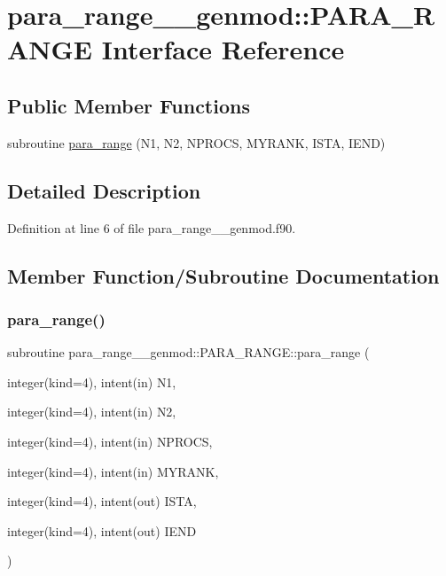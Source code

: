 \hypertarget{interfacepara__range____genmod_1_1_p_a_r_a___r_a_n_g_e}{}\section{para\+\_\+range\+\_\+\+\_\+genmod\+::P\+A\+R\+A\+\_\+\+R\+A\+N\+GE Interface Reference}
\label{interfacepara__range____genmod_1_1_p_a_r_a___r_a_n_g_e}
\subsection*{Public Member Functions}
\begin{DoxyCompactItemize}
\item 
subroutine \mbox{\hyperlink{interfacepara__range____genmod_1_1_p_a_r_a___r_a_n_g_e_af6bdef2d5f139349648221c9cd0d32d6}{para\+\_\+range}} (N1, N2, N\+P\+R\+O\+CS, M\+Y\+R\+A\+NK, I\+S\+TA, I\+E\+ND)
\end{DoxyCompactItemize}


\subsection{Detailed Description}


Definition at line 6 of file para\+\_\+range\+\_\+\+\_\+genmod.\+f90.



\subsection{Member Function/\+Subroutine Documentation}
\mbox{\label{interfacepara__range____genmod_1_1_p_a_r_a___r_a_n_g_e_af6bdef2d5f139349648221c9cd0d32d6}} 
\subsubsection{\texorpdfstring{para\_range()}{para\_range()}}
{\footnotesize\ttfamily subroutine para\+\_\+range\+\_\+\+\_\+genmod\+::\+P\+A\+R\+A\+\_\+\+R\+A\+N\+G\+E\+::para\+\_\+range (\begin{DoxyParamCaption}\item[{integer(kind=4), intent(in)}]{N1,  }\item[{integer(kind=4), intent(in)}]{N2,  }\item[{integer(kind=4), intent(in)}]{N\+P\+R\+O\+CS,  }\item[{integer(kind=4), intent(in)}]{M\+Y\+R\+A\+NK,  }\item[{integer(kind=4), intent(out)}]{I\+S\+TA,  }\item[{integer(kind=4), intent(out)}]{I\+E\+ND }\end{DoxyParamCaption})}



